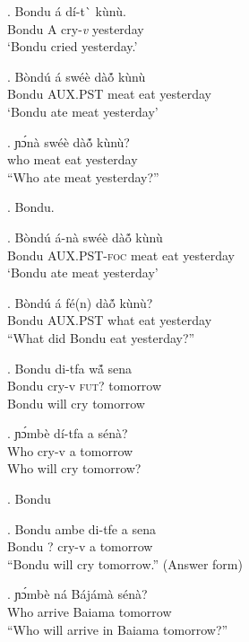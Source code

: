 \documentclass{assets/fieldnotes}
\begin{document}
\exg. Bondu \'{a} d\'{i}-t\`{} k\`{u}n\`{u}. \\
Bondu A cry-\textit{v} yesterday \\
`Bondu cried yesterday.'


\exg. Bòndú á swéè dàó̃ kùnù\\
Bondu AUX.PST meat eat yesterday \\%
    `Bondu ate meat yesterday'

\exg. ɲɔ́nà swéè dàó̃ kùnù?\\
who meat eat yesterday\\
``Who ate meat yesterday?''

\ex. Bondu.

\exg. Bòndú á-nà swéè dàó̃ kùnù\\
Bondu \textsc{AUX.PST-foc} meat eat yesterday \\%
    `Bondu ate meat yesterday'\\

\exg. Bòndú á fé(n) dàó̃ kùnù?\\
Bondu \textsc{AUX.PST} what eat yesterday\\
``What did Bondu eat yesterday?''




\exg. Bondu di-tfa w\'ã sena\\
Bondu cry-v \textsc{fut?} tomorrow\\
Bondu will cry tomorrow

\exg. ɲɔ́mbè dí-tfa a sénà?\\
Who cry-v a tomorrow\\
Who will cry tomorrow?

\ex. Bondu

\ex. Bondu ambe di-tfe a sena\\
Bondu ? cry-v a tomorrow\\
``Bondu will cry tomorrow.'' (Answer form)

\exg. ɲɔ́mbè ná Bájámà sénà?\\
Who arrive Baiama tomorrow\\
``Who will arrive in Baiama tomorrow?''
\end{document}
